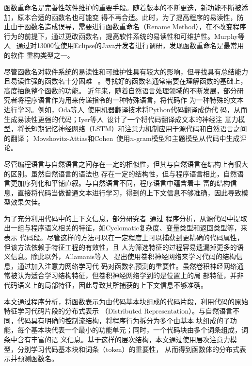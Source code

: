 函数重命名是完善性软件维护的重要手段。随着版本的不断更迭，新功能不断被添加，原本合适的函数名也可能变
得不再合适。此时，为了提高程序的易读性，防止由于函数名造成误导，需要进行函数重命名（Rename
Method），在不改变程序行为的前提下，通过更改函数名，提高软件系统的易读性和可维护性。Murphy等人
~\cite{Murphy-Hill:ICSE09}通过对13000位使用Eclipse的Java开发者进行调研，发现函数重命名是最常用的软件
重构类型之一。

尽管函数名对软件系统的易读性和可维护性具有较大的影响，但寻找具有总结能力且易读性强的函数名十分困难
~\cite{allamanis2015suggesting}。寻找好的函数名通常需要在理解函数的基础上，高度抽象整个函数的功能。
近年来，随着自然语言处理领域的不断发展，部分研究者将程序语言作为用来传递指令的一种特殊语言，将代码作
为一种特殊的文本进行学习。例如，Oda等人~\cite{oda2015learning}使用机器翻译技术将Python代码翻译成伪代
码，从而生成易读性更强的代码；Iyer等人~\cite{iyer2016summarizing}设计了一个将代码翻译成文本的神经注
意力模型，将长短期记忆神经网络（LSTM）和注意力机制应用于源代码和自然语言之间的翻译；
Movshovitz-Attias和Cohen~\cite{movshovitz2013natural}使用$n$-gram模型和主题模型从代码中生成评论。

尽管编程语言与自然语言之间存在一定的相似性，但其与自然语言在结构上有很大的区别。虽然自然语言的语法也
存在一定的结构性，但与程序语言相比，自然语言更加序列化和平铺直叙。与自然语言不同，程序语言中蕴含着丰
富的结构信息，直接将代码当做普通文本进行学习，得到的上下文信息不够准确，因此导致模型效果欠佳。

为了充分利用代码中的上下文信息，部分研究者~\cite{allamanis2015suggesting, haiduc2010supporting}通过
程序分析，从源代码中提取出一组与程序语义相关的特征，如Cyclomatic复杂度、变量类型和返回类型等，来表示
代码段。尽管这样的方法可以在一定程度上可以捕获到更精确的代码属性，但该方法依赖于特征工程的有效性，且
人为筛选特征的过程容易遗漏掉更多的语义信息。除此以外，Allamanis等人
~\cite{allamanis2016convolutional}提出使用卷积神经网络来学习代码的结构信息，通过加入注意力网络学习代
码对函数名预测的重要性。虽然卷积神经网络通常被认为适合学习结构特征，但卷积神经网络学到的是位置上的局
部特征，并非代码语义上的局部特征，因此导致其所捕获的上下文信息不够准确。

本文通过程序分析，将函数表示为由代码基本块组成的代码片段，利用代码的原始特征学习代码片段的分布式表示
（Distributed Representation）。与自然语言不同，代码具有明确的控制流结构，将程序行为拆分为多个由基本
块组成的子功能，每个基本块代表一个最小的功能单元；同时，一个代码块由多个词条组成，词条中含有丰富的语
义信息。基于这样的层次结构，本文通过使用层次注意力模型，分别学习代码基本块和词条（token）的重要性，
从而得到函数体的分布式表示并预测函数名。

